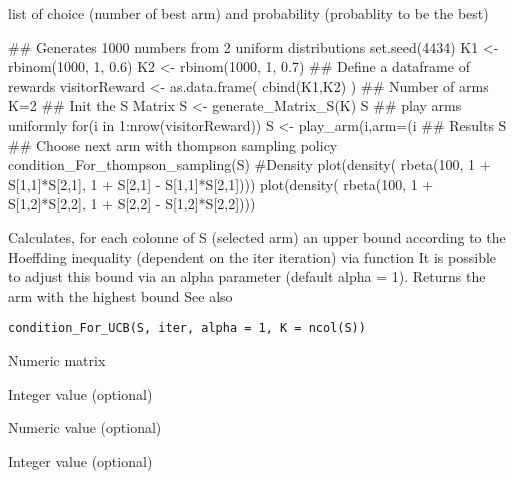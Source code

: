 \documentclass[letterpaper]{book}
\begin{document}
%
\begin{Value}
list of choice (number of best arm) and probability (probablity to be the best)
\end{Value}
%
\begin{Examples}
\begin{ExampleCode}
## Generates 1000 numbers from 2 uniform distributions
set.seed(4434)
K1 <- rbinom(1000, 1, 0.6)
K2 <- rbinom(1000, 1, 0.7)
## Define a dataframe of rewards
visitorReward <- as.data.frame( cbind(K1,K2) )
## Number of arms
K=2
## Init the S Matrix
S <- generate_Matrix_S(K)
S
## play arms uniformly
for(i in 1:nrow(visitorReward)){
S <- play_arm(i,arm=(i%
}
## Results
S
## Choose next arm with thompson sampling policy
condition_For_thompson_sampling(S)
#Density
plot(density( rbeta(100, 1 +  S[1,1]*S[2,1], 1 + S[2,1] - S[1,1]*S[2,1])))
plot(density( rbeta(100, 1 +  S[1,2]*S[2,2], 1 + S[2,2] - S[1,2]*S[2,2])))
\end{ExampleCode}
\end{Examples}
%
\begin{Description}\relax
Calculates, for each colonne of S (selected arm) an
upper bound according to the Hoeffding inequality
(dependent on the iter iteration) via  function
It is possible to adjust this bound via an
alpha parameter (default alpha = 1).
Returns the arm with the highest bound
See also 
\end{Description}
%
\begin{Usage}
\begin{verbatim}
condition_For_UCB(S, iter, alpha = 1, K = ncol(S))
\end{verbatim}
\end{Usage}
%
\begin{Arguments}
\begin{ldescription}
\item[\code{S}] Numeric matrix

\item[\code{iter}] Integer value (optional)

\item[\code{alpha}] Numeric value (optional)

\item[\code{K}] Integer value (optional)
\end{ldescription}
\end{Arguments}
\end{document}
